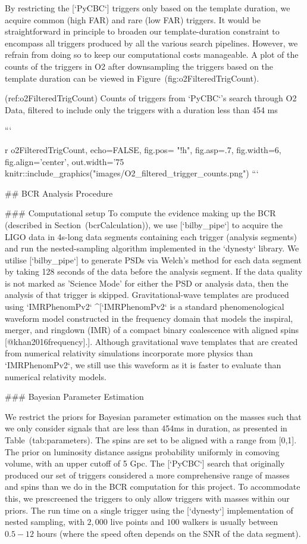 {{{{By restricting the [`PyCBC`] triggers only based on the template duration, we acquire common (high FAR) and rare (low
FAR) triggers. It would be straightforward in principle to broaden our template-duration constraint to encompass all
triggers produced by all the various search pipelines. However, we refrain from doing so to keep our computational costs
manageable. A plot of the counts of the triggers in O2 after downsampling the triggers based on the template duration
can be viewed in Figure~\@ref(fig:o2FilteredTrigCount).


(ref:o2FilteredTrigCount) Counts of triggers from `PyCBC`'s search through O2 Data, filtered to include only the triggers with a duration less than 454 ms

```{r o2FilteredTrigCount, echo=FALSE, fig.pos= "!h", fig.asp=.7, fig.width=6, fig.align='center', out.width='75%
knitr::include_graphics("images/O2_filtered_trigger_counts.png")
```




## BCR Analysis Procedure 

### Computational setup
To compute the evidence making up the BCR (described in Section~\@ref(bcrCalculation)), we use [`bilby_pipe`] to acquire
the LIGO data in 4s-long data segments containing each trigger (analysis segments) and run the nested-sampling algorithm
implemented in the `dynesty` library. We utilise [`bilby_pipe`] to generate PSDs via Welch's method for each data
segment by taking 128 seconds of the data before the analysis segment. If the data quality is not marked as 'Science
Mode' for either the PSD or analysis data, then the analysis of that trigger is skipped. Gravitational-wave templates
are produced using `IMRPhenomPv2` ^[`IMRPhenomPv2` is a standard phenomenological waveform model constructed in the
frequency domain that models the inspiral, merger, and ringdown (IMR) of a compact binary coalescence with aligned spins
[@khan2016frequency].]. Although gravitational wave templates that are created from numerical relativity simulations
incorporate more physics than `IMRPhenomPv2`, we still use this waveform as it is faster to evaluate than numerical
relativity models. 

### Bayesian Parameter Estimation

We restrict the priors for Bayesian parameter estimation on the masses such that we only consider signals that are less
than 454ms in duration, as presented in Table~\@ref(tab:parameters). The spins are set to be aligned with a range from
[0,1]. The prior on luminosity distance assigns probability uniformly in comoving volume, with an upper cutoff of 5 Gpc.
The [`PyCBC`] search that originally produced our set of triggers considered a more comprehensive range of masses and
spins than we do in the BCR computation for this project. To accommodate this, we prescreened the triggers to only allow
triggers with masses within our priors.  The run time on a single trigger using the [`dynesty`] implementation of nested
sampling, with $2,000$ live points and $100$ walkers is usually between $0.5-12$ hours (where the speed often depends on
the SNR of the data segment).


}}}}}
